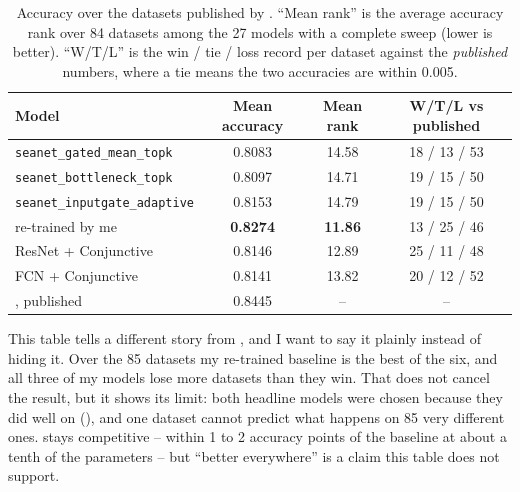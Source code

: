 \begin{table}[tbp]
\caption{Accuracy over the \ucr{} datasets published by \millet{}. ``Mean rank'' is the average
accuracy rank over 84 datasets among the 27 models with a complete sweep (lower is better).
``W/T/L'' is the win / tie / loss record per dataset against the \emph{published} \millet{}
numbers, where a tie means the two accuracies are within 0.005.}
\label{tab:ucr_accuracy}
\begin{center}
\footnotesize
\begin{tabular}{lccc}
\toprule
\textbf{Model} & \textbf{Mean accuracy} & \textbf{Mean rank} &
\textbf{W/T/L vs published} \\
\midrule
\texttt{seanet\_gated\_mean\_topk}   & 0.8083 & 14.58 & 18 / 13 / 53 \\
\texttt{seanet\_bottleneck\_topk}    & 0.8097 & 14.71 & 19 / 15 / 50 \\
\texttt{seanet\_inputgate\_adaptive} & 0.8153 & 14.79 & 19 / 15 / 50 \\
\millet{} re-trained by me   & \textbf{0.8274} & \textbf{11.86} & 13 / 25 / 46 \\
ResNet + Conjunctive         & 0.8146 & 12.89 & 25 / 11 / 48 \\
FCN + Conjunctive            & 0.8141 & 13.82 & 20 / 12 / 52 \\
\midrule
\millet{} \citep{early2024millet}, published & 0.8445 & -- & -- \\
\bottomrule
\end{tabular}
\end{center}
\end{table}

This table tells a different story from , and I want to say it plainly instead of
hiding it. Over the 85 \ucr{} datasets my re-trained \millet{} baseline is the best of the six, and
all three of my models lose more datasets than they win. That does not cancel the \webtraffic{}
result, but it shows its limit: both headline models were chosen because they did well on
\webtraffic{} (), and one dataset cannot predict what happens on 85 very
different ones. \seanet{} stays competitive -- within 1 to 2 accuracy points of the baseline at
about a tenth of the parameters -- but ``better everywhere'' is a claim this table does not support.

